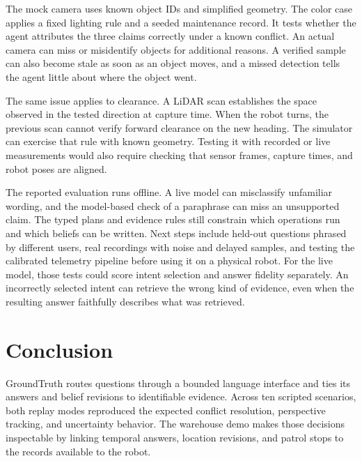 \documentclass[11pt,a4paper,twocolumn]{article}
\begin{document}
The mock camera uses known object IDs and simplified geometry.
The color case applies a fixed lighting rule and a seeded
maintenance record. It tests whether the agent attributes the three
claims correctly under a known conflict. An actual camera can miss or
misidentify objects for additional reasons. A verified sample can
also become stale as soon as an object moves, and a missed
detection tells the agent little about where the object went.

The same issue applies to clearance. A LiDAR scan establishes the
space observed in the tested direction at capture time. When the robot
turns, the previous scan cannot verify forward clearance on the new
heading. The simulator can exercise that rule with known geometry.
Testing it with recorded or live measurements would also require
checking that sensor frames, capture times, and robot poses are aligned.

The reported evaluation runs offline. A live model can misclassify
unfamiliar wording, and the model-based check of a paraphrase can
miss an unsupported claim. The typed plans and evidence rules still
constrain which operations run and which beliefs can be written.
Next steps include held-out questions phrased by different users,
real recordings with noise and delayed samples, and testing the
calibrated telemetry pipeline before using it on a physical robot.
For the live model, those tests could score intent selection and
answer fidelity separately. An incorrectly selected intent can
retrieve the wrong kind of evidence, even when the resulting answer
faithfully describes what was retrieved.

\section{Conclusion}
GroundTruth routes questions through a bounded language interface
and ties its answers and belief revisions to identifiable evidence.
Across ten scripted scenarios, both replay modes reproduced the
expected conflict resolution, perspective tracking, and uncertainty
behavior. The warehouse demo makes those decisions inspectable by
linking temporal answers, location revisions, and patrol stops to the
records available to the robot.
\end{document}
